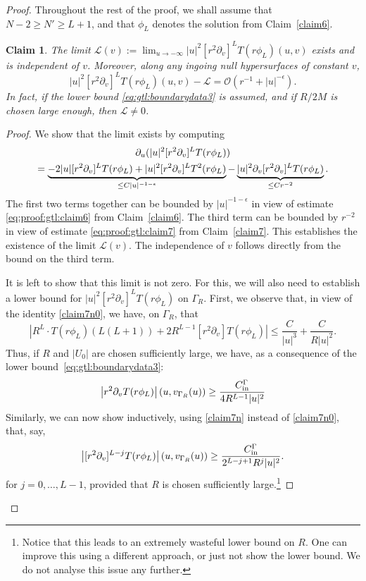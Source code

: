 \documentclass[11pt,english]{article}
\numberwithin{equation}{section}
\theoremstyle{remark}
\theoremstyle{plain}
\newtheorem{claim}{Claim}
\theoremstyle{remark}
\newcommand{\pu}{\partial_u}
\newcommand{\pv}{\partial_v}
\renewcommand{\(}{\left(}
\renewcommand{\)}{\right)}
\begin{document}
\begin{proof}
Throughout the rest of the proof, we shall assume that $N-2\geq N'\geq L+1$, and that $\phi_L$ denotes the solution from Claim~\ref{claim6}.
	\begin{claim}
	The limit $\mathcal{L}(v):=\lim_{u\to-\infty}|u|^2[r^2\pv]^LT(r\phi_L)(u,v)$ exists and is independent of $v$. Moreover, along any ingoing null hypersurfaces of constant $v$,
	\begin{equation}
	|u|^2[r^2\pv]^LT(r\phi_L)(u,v)-\mathcal{L}=\mathcal{O}(r^{-1}+ |u|^{-\epsilon}).
	\end{equation}
	In fact, if the lower bound \eqref{eq:gtl:boundarydata3} is assumed, and if $R/2M$ is chosen large enough, then $\mathcal{L}\neq 0$.
	\end{claim}
\begin{proof}
We show that the limit exists by computing
\begin{multline}
\pu(|u|^2\pvx{L}T(r\phi_L))\\
=\underbrace{-2|u| \pvx{L}T(r\phi_L)+|u|^2\pvx{L}T^2(r\phi_L)}_{\leq C|u|^{-1-\epsilon}}-\underbrace{|u|^2\pv\pvx{L}T(r\phi_L)}_{\leq Cr^{-2}}.
\end{multline}
The first two terms together can be bounded by $|u|^{-1-\epsilon}$ in view of  estimate \eqref{eq:proof:gtl:claim6} from Claim~\ref{claim6}. 
The third term can be bounded by $r^{-2}$ in view of  estimate \eqref{eq:proof:gtl:claim7} from Claim~\ref{claim7}.
 This establishes the existence of the limit $\mathcal L(v)$. 
 The independence of $v$ follows directly from the bound on the third term.

It is left to show that this limit is not zero. 
For this, we will also need to establish a lower bound for $|u|^2[r^2\pv]^LT(r\phi_L)$ on $\Gamma_R$. 
First, we observe that, in view of the identity \eqref{claim7n0}, we have, on $\Gamma_R$, that
\begin{equation}
\left|R^L\cdot T(r\phi_L)(L(L+1))+2R^{L-1}[r^2\pv]T(r\phi_L)\right|\leq \frac{C}{|u|^{3}}+\frac{C}{R|u|^2}.
\end{equation}
Thus, if $R$ and $|U_0|$ are chosen sufficiently large, we have, as a consequence of the lower bound~\eqref{eq:gtl:boundarydata3}:
\begin{equation}
\left|r^2\pv T(r\phi_L)\right|(u,v_{\Gamma_R}(u))\geq \frac{\cin}{4R^{L-1}|u|^2}
\end{equation}
Similarly, we can now show inductively, using \eqref{claim7n} instead of \eqref{claim7n0}, that, say, 
\begin{equation}
\left|[r^2\pv]^{L-j} T(r\phi_L)\right|(u,v_{\Gamma_R}(u))\geq \frac{\cin}{2^{L-j+1}R^{j}|u|^2}.
\end{equation}
for $j=0,\dots, L-1$, provided that $R$ is chosen sufficiently large.\footnote{Notice that this leads to an extremely wasteful lower bound on $R$. One can improve this using a different approach, or just not show the lower bound. We do not analyse this issue any further.}  


\end{proof}
\end{proof}
\end{document}
